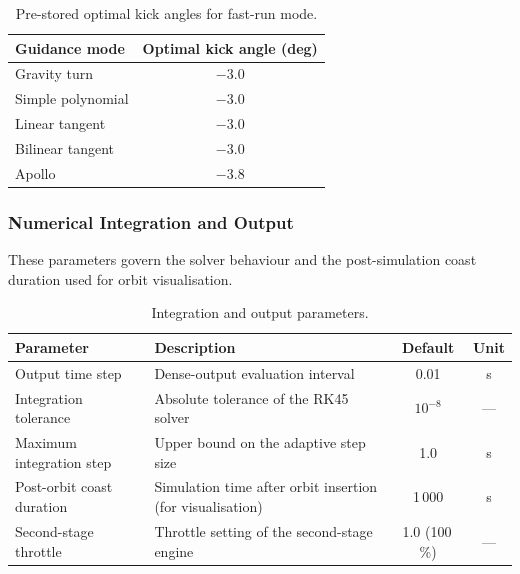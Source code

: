 \begin{table}[htbp]
  \centering
  \caption{Pre-stored optimal kick angles for fast-run mode.}
  \label{tab:param_fast_angles}
  \begin{tabular}{l c}
    \toprule
    \textbf{Guidance mode} & \textbf{Optimal kick angle (deg)} \\
    \midrule
    Gravity turn        & $-3.0$ \\
    Simple polynomial   & $-3.0$ \\
    Linear tangent      & $-3.0$ \\
    Bilinear tangent    & $-3.0$ \\
    Apollo              & $-3.8$ \\
    \bottomrule
  \end{tabular}
\end{table}

\subsubsection{Numerical Integration and Output}

These parameters govern the solver behaviour and the post-simulation coast
duration used for orbit visualisation.

\begin{table}[htbp]
  \centering
  \caption{Integration and output parameters.}
  \label{tab:param_integration}
  \begin{tabular}{l l c c}
    \toprule
    \textbf{Parameter} & \textbf{Description} & \textbf{Default} & \textbf{Unit} \\
    \midrule
    Output time step
      & Dense-output evaluation interval
      & 0.01  & s    \\
    Integration tolerance
      & Absolute tolerance of the RK45 solver
      & $10^{-8}$ & ---  \\
    Maximum integration step
      & Upper bound on the adaptive step size
      & 1.0   & s    \\
    Post-orbit coast duration
      & Simulation time after orbit insertion (for visualisation)
      & 1\,000 & s    \\
    Second-stage throttle
      & Throttle setting of the second-stage engine
      & 1.0 (100\,\%) & ---  \\
    \bottomrule
  \end{tabular}
\end{table}
